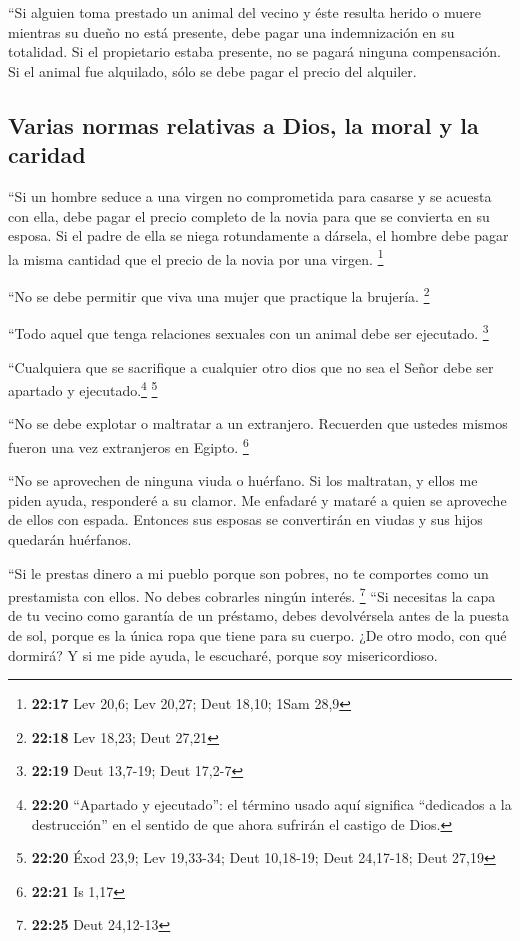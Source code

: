  ``Si alguien toma prestado un animal del vecino y éste
resulta herido o muere mientras su dueño no está presente, debe pagar
una indemnización en su totalidad.  Si el propietario
estaba presente, no se pagará ninguna compensación. Si el animal fue
alquilado, sólo se debe pagar el precio del alquiler.

\hypertarget{varias-normas-relativas-a-dios-la-moral-y-la-caridad}{%
\subsection{Varias normas relativas a Dios, la moral y la
caridad}\label{varias-normas-relativas-a-dios-la-moral-y-la-caridad}}

 ``Si un hombre seduce a una virgen no comprometida para
casarse y se acuesta con ella, debe pagar el precio completo de la novia
para que se convierta en su esposa.  Si el padre de ella
se niega rotundamente a dársela, el hombre debe pagar la misma cantidad
que el precio de la novia por una virgen. \footnote{\textbf{22:17} Lev
  20,6; Lev 20,27; Deut 18,10; 1Sam 28,9}

 ``No se debe permitir que viva una mujer que practique
la brujería. \footnote{\textbf{22:18} Lev 18,23; Deut 27,21}

 ``Todo aquel que tenga relaciones sexuales con un animal
debe ser ejecutado. \footnote{\textbf{22:19} Deut 13,7-19; Deut 17,2-7}

 ``Cualquiera que se sacrifique a cualquier otro dios que
no sea el Señor debe ser apartado y ejecutado.\footnote{\textbf{22:20}
  ``Apartado y ejecutado'': el término usado aquí significa ``dedicados
  a la destrucción'' en el sentido de que ahora sufrirán el castigo de
  Dios.} \footnote{\textbf{22:20} Éxod 23,9; Lev 19,33-34; Deut
  10,18-19; Deut 24,17-18; Deut 27,19}

 ``No se debe explotar o maltratar a un extranjero.
Recuerden que ustedes mismos fueron una vez extranjeros en Egipto.
\footnote{\textbf{22:21} Is 1,17}

 ``No se aprovechen de ninguna viuda o huérfano.
 Si los maltratan, y ellos me piden ayuda, responderé a
su clamor.  Me enfadaré y mataré a quien se aproveche de
ellos con espada. Entonces sus esposas se convertirán en viudas y sus
hijos quedarán huérfanos.

 ``Si le prestas dinero a mi pueblo porque son pobres, no
te comportes como un prestamista con ellos. No debes cobrarles ningún
interés. \footnote{\textbf{22:25} Deut 24,12-13}  ``Si
necesitas la capa de tu vecino como garantía de un préstamo, debes
devolvérsela antes de la puesta de sol,  porque es la
única ropa que tiene para su cuerpo. ¿De otro modo, con qué dormirá? Y
si me pide ayuda, le escucharé, porque soy misericordioso.

